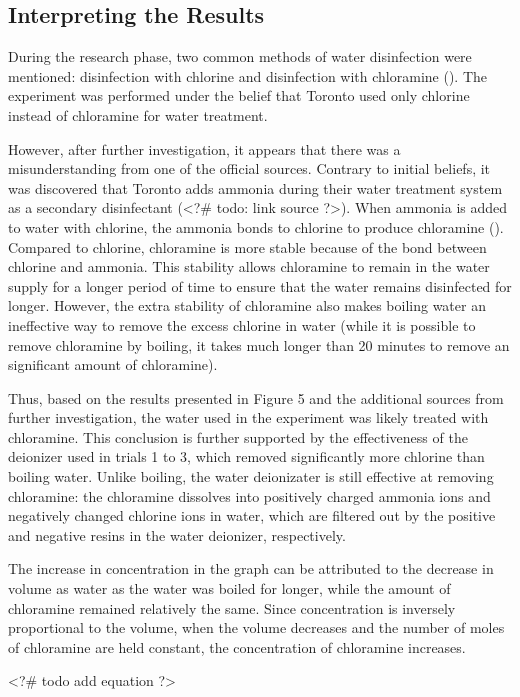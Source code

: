 \documentclass[11pt]{article}
\begin{document}
\subsection{Interpreting the Results}

During the research phase, two common methods of water disinfection were mentioned: disinfection with chlorine and disinfection with chloramine (). The experiment was performed under the belief that Toronto used only chlorine instead of chloramine for water treatment.

However, after further investigation, it appears that there was a misunderstanding from one of the official sources. Contrary to initial beliefs, it was discovered that Toronto adds ammonia during their water treatment system as a secondary disinfectant (<?# todo: link source ?>). When ammonia is added to water with chlorine, the ammonia bonds to chlorine to produce chloramine (). Compared to chlorine, chloramine is more stable because of the bond between chlorine and ammonia. This stability allows chloramine to remain in the water supply for a longer period of time to ensure that the water remains disinfected for longer. However, the extra stability of chloramine also makes boiling water an ineffective way to remove the excess chlorine in water (while it is possible to remove chloramine by boiling, it takes much longer than 20 minutes to remove an significant amount of chloramine).

Thus, based on the results presented in Figure 5 and the additional sources from further investigation, the water used in the experiment was likely treated with chloramine. This conclusion is further supported by the effectiveness of the deionizer used in trials 1 to 3, which removed significantly more chlorine than boiling water. Unlike boiling, the water deionizater is still effective at removing chloramine: the chloramine dissolves into positively charged ammonia ions and negatively changed chlorine ions in water, which are filtered out by the positive and negative resins in the water deionizer, respectively.

The increase in concentration in the graph can be attributed to the decrease in volume as water as the water was boiled for longer, while the amount of chloramine remained relatively the same. Since concentration is inversely proportional to the volume, when the volume decreases and the number of moles of chloramine are held constant, the concentration of chloramine increases.

<?# todo add equation ?>
\end{document}
